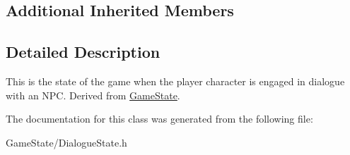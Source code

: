 \subsection*{Additional Inherited Members}


\subsection{Detailed Description}
This is the state of the game when the player character is engaged in dialogue with an N\-P\-C. Derived from \hyperlink{classGameState}{Game\-State}. 

The documentation for this class was generated from the following file\-:\begin{DoxyCompactItemize}
\item 
Game\-State/Dialogue\-State.\-h\end{DoxyCompactItemize}

